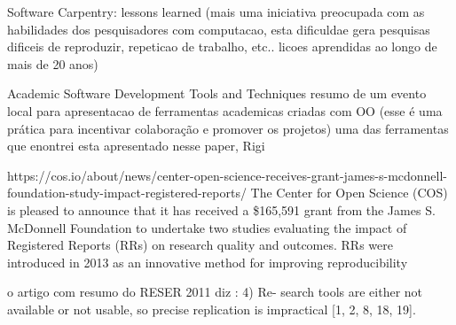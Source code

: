 Software Carpentry: lessons learned \cite{wilson2014software}
(mais uma iniciativa preocupada com as habilidades dos pesquisadores
com computacao, esta dificuldae gera pesquisas dificeis de reproduzir,
repeticao de trabalho, etc.. licoes aprendidas ao longo de mais de 20 anos)

Academic Software Development Tools and Techniques
resumo de um evento local para apresentacao de ferramentas academicas criadas com OO
(esse é uma prática para incentivar colaboração e promover os projetos)
uma das ferramentas que enontrei esta apresentado nesse paper, Rigi

https://cos.io/about/news/center-open-science-receives-grant-james-s-mcdonnell-foundation-study-impact-registered-reports/
The Center for Open Science (COS) is pleased to announce that it has received a
\$165,591 grant from the James S. McDonnell Foundation to undertake two studies
evaluating the impact of Registered Reports (RRs) on research quality and
outcomes. RRs were introduced in 2013 as an innovative method for improving
reproducibility

o artigo com resumo do RESER 2011 diz \cite{knutson2010report}:
4) Re-
search tools are either not available or not usable, so precise
replication is impractical [1, 2, 8, 18, 19].

%
%
%
%
%
%
